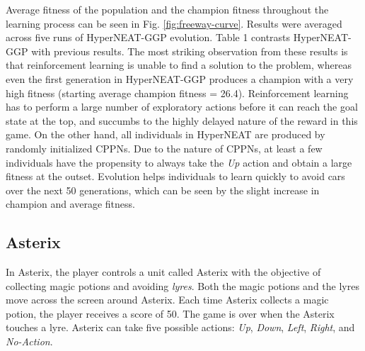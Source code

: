 \documentclass{acm_proc_article-sp}
\begin{document}
Average fitness of the population and the champion fitness throughout the learning process can be seen in Fig. \ref{fig:freeway-curve}. Results were averaged across five runs of HyperNEAT-GGP evolution. Table 1 contrasts HyperNEAT-GGP with previous results. The most striking observation from these results is that reinforcement learning is unable to find a solution to the problem, whereas even the first generation in HyperNEAT-GGP produces a champion with a very high fitness (starting average champion fitness = 26.4). Reinforcement learning has to perform a large number of exploratory actions before it can reach the goal state at the top, and succumbs to the highly delayed nature of the reward in this game. On the other hand, all individuals in HyperNEAT are produced by randomly initialized CPPNs. Due to the nature of CPPNs, at least a few individuals have the propensity to always take the \textit{Up} action and obtain a large fitness at the outset. Evolution helps individuals to learn quickly to avoid cars over the next 50 generations, which can be seen by the slight increase in champion and average fitness.

\subsection {Asterix}
In Asterix, the player controls a unit called Asterix with the objective of collecting magic potions and avoiding \textit{lyres}. Both the magic potions and the lyres move across the screen around Asterix. Each time Asterix collects a magic potion, the player receives a score of 50. The game is over when the Asterix touches a lyre. Asterix can take five possible actions: \textit{Up}, \textit{Down}, \textit{Left}, \textit{Right}, and \textit{No-Action}.
\end{document}
